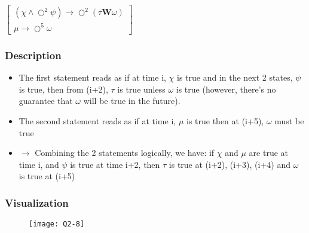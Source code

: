 \newpage
\subsection{}

$
\begin{bmatrix}
(\chi \land \bigcirc^{2} \psi) \rightarrow \bigcirc^{2} (\tau \textbf{W} \omega) \\
\mu \rightarrow \bigcirc^{5} \omega
\end{bmatrix}
$

\subsubsection{Description}
\begin{itemize}
    \item The first statement reads as if at time i, $\chi$ is true and in the next 2 states, $\psi$ is true, then from (i+2), $\tau$ is true unless $\omega$ is true (however, there's no guarantee that $\omega$ will be true in the future).
    \item The second statement reads as if at time i, $\mu$ is true then at (i+5), $\omega$ must be true
    \item[] $\rightarrow$ Combining the 2 statements logically, we have: if $\chi$ and $\mu$ are true at time i, and $\psi$ is true at time i+2, then $\tau$ is true at (i+2), (i+3), (i+4) and $\omega$ is true at (i+5)
\end{itemize}

\subsubsection{Visualization}

\begin{figure}[h!]
	\centering \texttt{[image: Q2-8]}
\end{figure}